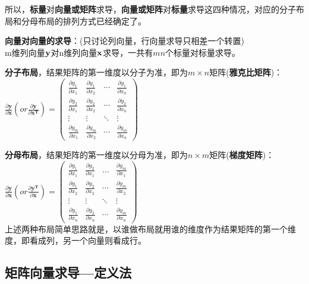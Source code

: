 \documentclass[UTF8]{article}
\begin{document}
    所以，\textbf{标量}对\textbf{向量或矩阵}求导，\textbf{向量或矩阵}对\textbf{标量}求导这四种情况，对应的分子布局和分母布局的排列方式已经确定了。


    \textbf{向量对向量的求导}：(只讨论列向量，行向量求导只相差一个转置) \\
    m维列向量$\bf{y}$对n维列向量$\bf{x}$求导，一共有$mn$个标量对标量求导。


    \textbf{分子布局}，结果矩阵的第一维度以分子为准，即为$m\times n$矩阵(\textbf{雅克比矩阵})：\\
    $\frac{\partial \mathbf{y}}{\partial \mathbf{x}}(or \frac{\partial \mathbf{y}}{\partial \mathbf{x}^{\mathbf{T}}})=\left(\begin{array}{cccc}{\frac{\partial y_{1}}{\partial x_{1}}} & {\frac{\partial y_{1}}{\partial x_{2}}} & {\cdots} & {\frac{\partial y_{1}}{\partial x_{n}}} \\ {\frac{\partial y_{2}}{\partial x_{1}}} & {\frac{\partial y_{2}}{\partial x_{2}}} & {\cdots} & {\frac{\partial y_{2}}{\partial x_{n}}} \\ {\vdots} & {\vdots} & {\ddots} & {\vdots} \\ {\frac{\partial y_{m}}{\partial x_{1}}} & {\frac{\partial y_{m}}{\partial x_{2}}} & {\cdots} & {\frac{\partial y_{m}}{\partial x_{n}}}\end{array}\right)$


    \textbf{分母布局}，结果矩阵的第一维度以分母为准，即为$n\times m$矩阵(\textbf{梯度矩阵})： \\
    $\frac{\partial \mathbf{y}}{\partial \mathbf{x}}(or \frac{\partial \mathbf{y^{T}}}{\partial \mathbf{x}})=\left(\begin{array}{cccc}{\frac{\partial y_{1}}{\partial x_{1}}} & {\frac{\partial y_{2}}{\partial x_{1}}} & {\ldots} & {\frac{\partial y_{m}}{\partial x_{1}}} \\ {\frac{\partial y_{1}}{\partial x_{2}}} & {\frac{\partial y_{2}}{\partial x_{2}}} & {\cdots} & {\frac{\partial y_{m}}{\partial x_{2}}} \\ {\vdots} & {\vdots} & {\ddots} & {\vdots} \\ {\frac{\partial y_{1}}{\partial x_{n}}} & {\frac{\partial y_{2}}{\partial x_{n}}} & {\cdots} & {\frac{\partial y_{m}}{\partial x_{n}}}\end{array}\right)$
    \\
    上述两种布局简单思路就是，以谁做布局就用谁的维度作为结果矩阵的第一个维度，即看成列，另一个向量则看成行。

    \subsection{矩阵向量求导---定义法}
\end{document}
